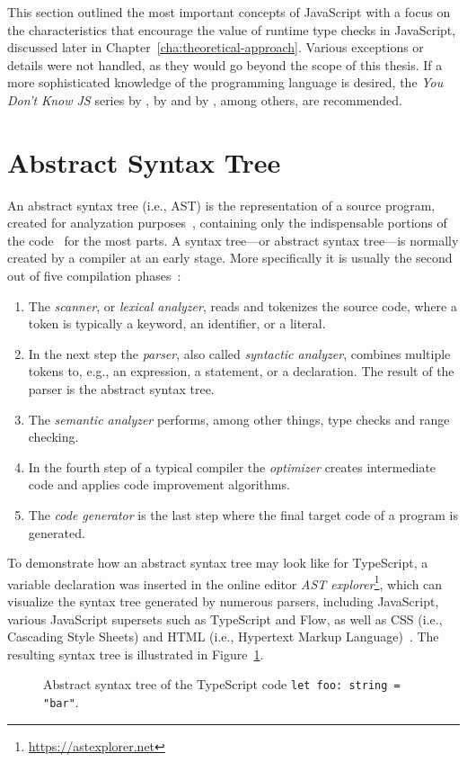 This section outlined the most important concepts of JavaScript with a focus on the characteristics that encourage the value of runtime type checks in JavaScript, discussed later in Chapter~\ref{cha:theoretical-approach}. Various exceptions or details were not handled, as they would go beyond the scope of this thesis. If a more sophisticated knowledge of the programming language is desired, the \emph{You Don't Know JS} series by \citeauthor{YDKJS:UpAndGoing:Simpson:2015}, \emph{\emph{}} by \citeauthor{JavaScriptTheGoodParts:Crockford:2008} and \emph{\emph{}} by \citeauthor{JavaScriptTheDefinitiveGuide:Flanagan:2011}, among others, are recommended.

\section{Abstract Syntax Tree}
\label{sec:ast}

An abstract syntax tree (i.e., AST) is the representation of a source program, created for analyzation purposes~\cite[p.~19]{CompilersAndInterpreters:Kenneth:2004}, containing only the indispensable portions of the code~\cite[p.~12]{FormaleSprachenAbstrakteAutomatenUndCompiler:Wagenknecht:2014} for the most parts. A syntax tree---or abstract syntax tree---is normally created by a compiler at an early stage. More specifically it is usually the second out of five compilation phases~\cite[pp.~2--3]{CompilersAndInterpreters:Kenneth:2004}: 
\begin{enumerate}
  \item The \emph{scanner}, or \emph{lexical analyzer}, reads and tokenizes the source code, where a token is typically a keyword, an identifier, or a literal.
  \item In the next step the \emph{parser}, also called \emph{syntactic analyzer}, combines multiple tokens to, e.g., an expression, a statement, or a declaration. The result of the parser is the abstract syntax tree.
  \item The \emph{semantic analyzer} performs, among other things, type checks and range checking.
  \item In the fourth step of a typical compiler the \emph{optimizer} creates intermediate code and applies code improvement algorithms.
  \item The \emph{code generator} is the last step where the final target code of a program is generated.
\end{enumerate}
To demonstrate how an abstract syntax tree may look like for TypeScript, a variable declaration was inserted in the online editor \emph{AST explorer}\footnote{\url{https://astexplorer.net}}, which can visualize the syntax tree generated by numerous parsers, including JavaScript, various JavaScript supersets such as TypeScript and Flow, as well as CSS (i.e., Cascading Style Sheets) and HTML (i.e., Hypertext Markup Language)~\cite{ASTExplorer}. The resulting syntax tree is illustrated in Figure~\ref{fig:ast}.

\begin{figure}
\centering

\caption{Abstract syntax tree of the TypeScript code \texttt{let foo: string = "bar"}.}
\label{fig:ast}
\end{figure}
